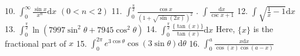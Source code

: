 \documentclass{article}
\newcommand{\dd}{\mathrm{d}}
\begin{document}
\begin{flushleft}
10. $\int_0^{\infty} \frac{\sin{x}}{x^n} \dd x$  $(0<n<2)$ \newline  \newline \newline 
11. $\int_0^{\frac{\pi}{2}} \frac{\cos{x}}{(1+\sqrt{\sin(2x)})^2}$ \newline \newline {}. $\int \frac{\dd x}{\csc{x}+1}$ \newline  \newline \newline 
12. $\int \sqrt{\frac{1}{x}-1} \dd x$ \newline  \newline \newline 
13. $\int_0^{\frac{\pi}{2}} \ln(7997\sin^2{\theta}+7945\cos^2{\theta})$ \newline  \newline \newline  %
14. $\int_0^{\frac{\pi}{2}} \frac{\{\tan(x)\}}{\tan(x)} \dd x$ Here, $\{x\}$ is the fractional part of $x$ \newline  \newline \newline 
15. $\int_0^{2\pi} e^{3\cos{\theta}}\cos(3\sin{\theta}) \dd \theta $ \newline  \newline \newline 
16. $\int_0^a \frac{x \dd x}{\cos(x)\cos(a-x)}$ \newline  \newline \newline 

\end{flushleft}
\end{document}

